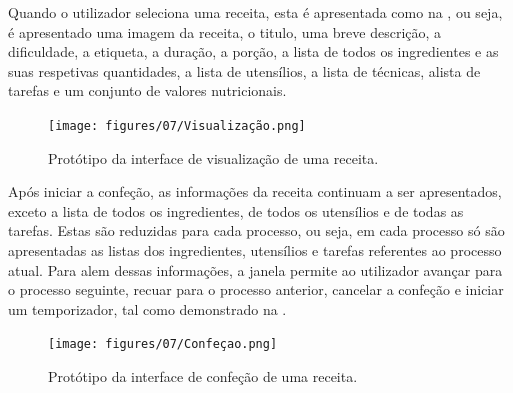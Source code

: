 Quando o utilizador seleciona uma receita, esta é apresentada como na , ou seja, é apresentado uma imagem da receita, o titulo, uma breve descrição, a dificuldade, a etiqueta, a duração, a porção, a lista de todos os ingredientes e as suas respetivas quantidades, a lista de utensílios, a lista de técnicas, alista de tarefas e um conjunto de valores nutricionais.

\begin{figure}[H]
  \centering 
  \texttt{[image: figures/07/Visualização.png]}
  \caption{Protótipo da interface de visualização de uma receita.}
  \label{fig:interface:visualizacao}
\end{figure}
 
 Após iniciar a confeção, as informações da receita continuam a ser apresentados, exceto a lista de todos os ingredientes, de todos os utensílios e de todas as tarefas. Estas são reduzidas para cada processo, ou seja, em cada processo só são apresentadas as listas dos ingredientes, utensílios e tarefas referentes ao processo atual. Para alem dessas informações, a janela permite ao utilizador avançar para o processo seguinte, recuar para o processo anterior, cancelar a confeção e iniciar um temporizador, tal como demonstrado na .

\begin{figure}[H]
  \centering 
  \texttt{[image: figures/07/Confeçao.png]}
  \caption{Protótipo da interface de confeção de uma receita.}
  \label{fig:interface:confecao}
\end{figure}





